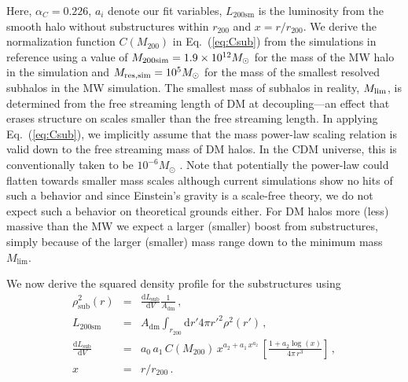 \documentclass[10pt,aps,pra,reprint,amsmath,amsfonts,amssymb,showpacs,nofootinbib,floatfix]{revtex4-1}
\newcommand{\rmn}{\mathrm}
\newcommand{\msun}{M_\odot}
\newcommand{\sm}{\rmn{sm}}
\newcommand{\dd}{\rmn{d}}
\newcommand{\rvir}{r_{200}}
\newcommand{\mvir}{M_{200}}
\begin{document}
Here, $\alpha_C=0.226$, $a_i$ denote our fit variables, $L_{200\sm}$
is the luminosity from the smooth halo without substructures within
$\rvir$ and $x= r/\rvir$.  We derive the normalization function
$C(\mvir)$ in Eq.~(\ref{eq:Csub}) from the simulations in reference
\cite{2008Natur.456...73S} using a value of $M_{\rm
  200sim}=1.9\times10^{12}\msun$ for the mass of the MW halo in the
simulation and $M_{\rm res,sim}=10^5\msun$ for the mass of the
smallest resolved subhalos in the MW simulation.  The smallest mass of
subhalos in reality, $M_{\rm lim}$, is determined from the free
streaming length of DM at decoupling---an effect that erases structure
on scales smaller than the free streaming length. In applying
Eq.~(\ref{eq:Csub}), we implicitly assume that the mass power-law
scaling relation is valid down to the free streaming mass of DM
halos. In the CDM universe, this is conventionally taken to be
$10^{-6}\msun$ \cite{2001PhRvD..64h3507H, 2005JCAP...08..003G}. Note
that potentially the power-law could flatten towards smaller mass
scales although current simulations show no hits of such a behavior
and since Einstein's gravity is a scale-free theory, we do not expect
such a behavior on theoretical grounds either.  For DM halos more
(less) massive than the MW we expect a larger (smaller) boost from
substructures, simply because of the larger (smaller) mass range down
to the minimum mass $M_\rmn{lim}$.

We now derive the squared density profile for the substructures
using
\begin{eqnarray}
\rho_\rmn{sub}^2(r) &=& \frac{\dd L_\rmn{sub}}{\dd V} \frac{1}{A_{\rmn{dm}}}\,,\label{eq:rho_sub}\\
L_{200\sm} &=&  A_{\rmn{dm}} \int_{\rvir} \dd r' 4\pi r'^2 \rho^2(r')\,,\label{eq:Lsm}\\
 \frac{\dd L_\rmn{sub}}{\dd V} &=& a_0\,a_1\,C(\mvir)\,x^{a_2+a_1\,x^{a_2}}\,
\left[\frac{1+a_2\log(x)}{4\pi\,r^3}\right]\,,\\
x &=& r/\rvir\,.\label{eq:xvir}
\end{eqnarray} 
\end{document}
